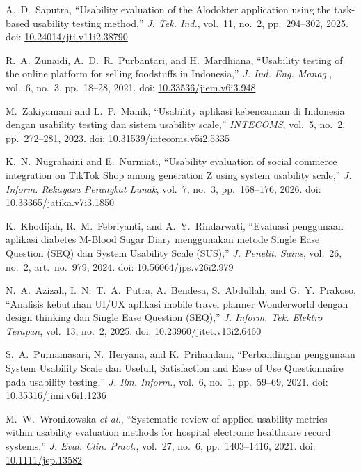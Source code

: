 \documentclass[conference]{IEEEtran}
\begin{document}
\begin{thebibliography}{}
A.~D.~Saputra, ``Usability evaluation of the Alodokter application using
the task-based usability testing method,'' \emph{J. Tek. Ind.}, vol.~11,
no.~2, pp.~294--302, 2025. doi:
\href{https://doi.org/10.24014/jti.v11i2.38790}{10.24014/jti.v11i2.38790}

R.~A.~Zunaidi, A.~D.~R.~Purbantari, and H.~Mardhiana, ``Usability testing
of the online platform for selling foodstuffs in Indonesia,''
\emph{J. Ind. Eng. Manag.}, vol.~6, no.~3, pp.~18--28, 2021. doi:
\href{https://doi.org/10.33536/jiem.v6i3.948}{10.33536/jiem.v6i3.948}

M.~Zakiyamani and L.~P.~Manik, ``Usability aplikasi kebencanaan di
Indonesia dengan usability testing dan sistem usability scale,''
\emph{INTECOMS}, vol.~5, no.~2, pp.~272--281, 2023. doi:
\href{https://doi.org/10.31539/intecoms.v5i2.5335}{10.31539/intecoms.v5i2.5335}

K.~N.~Nugrahaini and E.~Nurmiati, ``Usability evaluation of social
commerce integration on TikTok Shop among generation Z using system
usability scale,'' \emph{J. Inform. Rekayasa Perangkat Lunak}, vol.~7,
no.~3, pp.~168--176, 2026. doi:
\href{https://doi.org/10.33365/jatika.v7i3.1850}{10.33365/jatika.v7i3.1850}

K.~Khodijah, R.~M.~Febriyanti, and A.~Y.~Rindarwati, ``Evaluasi penggunaan
aplikasi diabetes M-Blood Sugar Diary menggunakan metode Single Ease
Question (SEQ) dan System Usability Scale (SUS),'' \emph{J. Penelit. Sains},
vol.~26, no.~2, art.~no.~979, 2024. doi:
\href{https://doi.org/10.56064/jps.v26i2.979}{10.56064/jps.v26i2.979}

N.~A.~Azizah, I.~N.~T.~A.~Putra, A.~Bendesa, S.~Abdullah, and
G.~Y.~Prakoso, ``Analisis kebutuhan UI/UX aplikasi mobile travel planner
Wonderworld dengan design thinking dan Single Ease Question (SEQ),''
\emph{J. Inform. Tek. Elektro Terapan}, vol.~13, no.~2, 2025. doi:
\href{https://doi.org/10.23960/jitet.v13i2.6460}{10.23960/jitet.v13i2.6460}

S.~A.~Purnamasari, N.~Heryana, and K.~Prihandani, ``Perbandingan
penggunaan System Usability Scale dan Usefull, Satisfaction and Ease of
Use Questionnaire pada usability testing,'' \emph{J. Ilm. Inform.}, vol.~6,
no.~1, pp.~59--69, 2021. doi:
\href{https://doi.org/10.35316/jimi.v6i1.1236}{10.35316/jimi.v6i1.1236}

M.~W.~Wronikowska \emph{et al.}, ``Systematic review of applied usability
metrics within usability evaluation methods for hospital electronic
healthcare record systems,'' \emph{J. Eval. Clin. Pract.}, vol.~27, no.~6,
pp.~1403--1416, 2021. doi:
\href{https://doi.org/10.1111/jep.13582}{10.1111/jep.13582}


\end{thebibliography}
\end{document}
